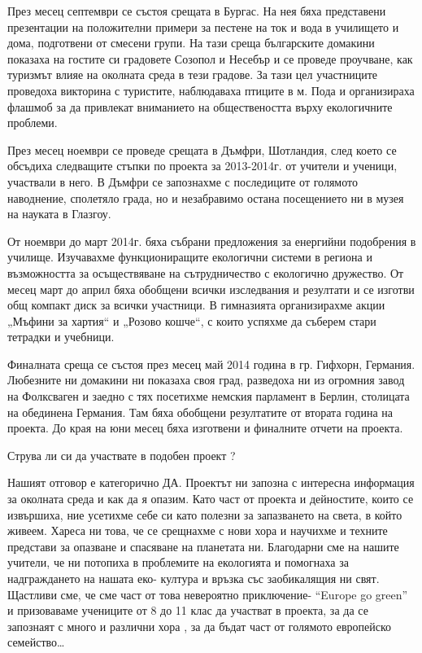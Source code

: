 \begin{multicols}{3}
През месец септември се състоя срещата в Бургас. На нея бяха представени  презентации на положителни примери за пестене на ток и вода в училището и дома, подготвени от смесени групи. На тази среща българските домакини показаха на гостите си градовете Созопол и Несебър и се проведе проучване, как туризмът влияе на околната среда в тези градове. За тази цел участниците проведоха викторина с туристите, наблюдаваха птиците в м. Пода и организираха флашмоб за да привлекат вниманието на обществеността върху екологичните проблеми.  

През месец ноември се проведе срещата в Дъмфри, Шотландия, след което се обсъдиха  следващите стъпки по проекта за 2013-2014г. от учители и ученици, участвали в него. В Дъмфри се запознахме с последиците от голямото наводнение, сполетяло града, но и незабравимо остана посещението ни в музея на науката в Глазгоу.

От ноември до март 2014г. бяха събрани предложения за енергийни подобрения в училище. Изучавахме функциониращите екологични системи в региона и възможността за осъществяване на сътрудничество с екологично дружество. От месец март до април бяха обобщени всички изследвания и резултати и се изготви общ компакт диск за всички участници. В гимназията организирахме акции „Мъфини за хартия“ и „Розово кошче“, с които успяхме да съберем стари тетрадки и учебници.

Финалната среща се състоя през месец май 2014 година в гр. Гифхорн, Германия. Любезните ни домакини ни показаха своя град, разведоха ни из огромния завод на Фолксваген и заедно с тях посетихме немския парламент в Берлин, столицата на обединена Германия. Там бяха обобщени резултатите от втората година на проекта. До края на юни месец бяха изготвени и финалните отчети на проекта.

Струва ли си да участвате в подобен проект ? 

Нашият отговор е категорично ДА. Проектът ни запозна с интересна информация за околната среда и как да я опазим. Като част от проекта и дейностите, които се извършиха, ние усетихме себе си като полезни за запазването на света, в който живеем. Хареса ни това, че се срещнахме с нови хора и научихме и техните представи за опазване и спасяване на планетата ни. Благодарни сме на нашите учители, че ни потопиха в проблемите на екологията и помогнаха за надграждането на нашата еко- култура и връзка със заобикалящия ни свят. Щастливи сме, че сме част от това невероятно приключение- “Europe go green” и призоваваме учениците от 8 до 11 клас да участват в проекта, за да се запознаят с много и различни хора , за да  бъдат част от голямото европейско семейство…
\end{multicols}

